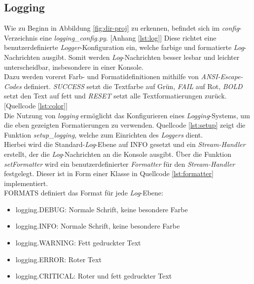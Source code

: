 \subsection{Logging}
Wie zu Beginn in Abbildung \ref{fig:dir-proj} zu erkennen, befindet sich im \textit{config}-Verzeichnis eine \textit{logging\_config.py}. [Anhang \ref{lst:log}] Diese richtet eine benutzerdefinierte \textit{Logger}-Konfiguration ein, welche farbige und formatierte \textit{Log}-Nachrichten ausgibt. Somit werden \textit{Log}-Nachrichten besser lesbar und leichter unterscheidbar, insbesondere in einer Konsole.\\ Dazu werden vorerst Farb- und Formatidefinitionen mithilfe von \textit{ANSI-Escape-Codes} definiert. \textit{SUCCESS} setzt die Textfarbe auf Grün, \textit{FAIL} auf Rot, \textit{BOLD} setzt den Text auf fett und \textit{RESET} setzt alle Textformatierungen zurück. [Quellcode \ref{lst:color}]\\
\vspace{-.3cm}
Die Nutzung von \textit{logging} ermöglicht das Konfigurieren eines \textit{Logging}-Systems, um die eben gezeigten Formatierungen zu verwenden. Quellcode \ref{lst:setup} zeigt die Funktion \textit{setup\_logging}, welche zum Einrichten des \textit{Loggers} dient. \\
\vspace{-.3cm}Hierbei wird die Standard-\textit{Log}-Ebene auf INFO gesetzt und ein \textit{Stream-Handler} erstellt, der die \textit{Log}-Nachrichten an die Konsole ausgibt.
Über die Funktion \textit{setFormatter} wird ein benutzerdefinierter \textit{Formatter} für den \textit{Stream-Handler} festgelegt. Dieser ist in Form einer Klasse in Quellcode \ref{lst:formatter} implementiert.\\
\vspace{-.3cm}
FORMATS definiert das Format für jede \textit{Log}-Ebene:
\begin{itemize}
    \setlength{\parskip}{1pt}
    \item logging.DEBUG: Normale Schrift, keine besondere Farbe
    \item logging.INFO: Normale Schrift, keine besondere Farbe
    \item logging.WARNING: Fett gedruckter Text
    \item logging.ERROR: Roter Text
    \item logging.CRITICAL: Roter und fett gedruckter Text
\end{itemize}
